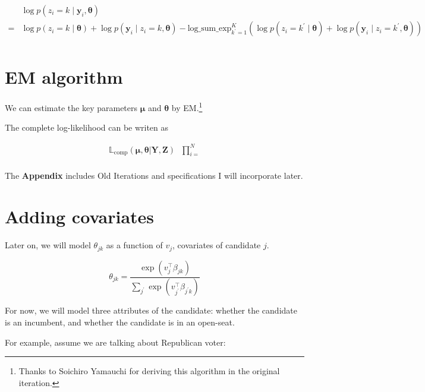 \documentclass[12pt,letterpaper]{article}
\numberwithin{equation}{section}
\newcommand{\bth}{\bm{\theta}}
\newcommand{\bmu}{\bm{\mu}}
\newcommand{\by}{\mathbf{y}}
\newcommand{\bY}{\mathbf{Y}}
\newcommand{\bZ}{\mathbf{Z}}
\begin{document}
\begin{align*}
&\log p(z_i = k \mid \by_{i}, \bth)\\
=& \log p(z_i = k \mid \bth) + \log p(\by_i \mid z_i = k,  \bth)   - \mathrm{log\_sum\_exp}_{k^\prime = 1}^K\left(\log p(z_i = k^\prime \mid \bth) + \log p(\by_i \mid z_i = k^\prime, \bth)\right)\\
\end{align*}

\pagebreak

\section{EM algorithm}

We can estimate the key parameters \(\bmu\) and \(\bth\) by
EM.\footnote{Thanks to Soichiro Yamauchi for deriving this algorithm in the original iteration.}

The complete log-likelihood can be writen as

\begin{align}
\mathds{L}_{\mathrm{comp}}(\bmu, \bth | \bY, \bZ) & \prod^{N}_{i=} \\
\end{align}

\pagebreak

\appendix

The \textbf{Appendix} includes Old Iterations and specifications I will
incorporate later.

\section{Adding covariates}

Later on, we will model \(\theta_{jk}\) as a function of \(v_{j}\),
covariates of candidate \(j\).

\[\theta_{jk} = \frac{\exp(v_{j}^{\top}\beta_{jk})}{\sum_{j^{\prime}} \exp(v_{j^{\prime}}^{\top}\beta_{j^{\prime}k})} \]

For now, we will model three attributes of the candidate: whether the
candidate is an incumbent, and whether the candidate is in an open-seat.

For example, assume we are talking about Republican voter:
\end{document}
